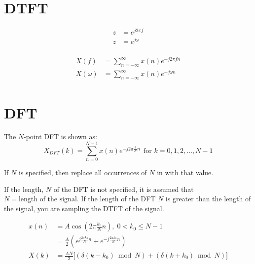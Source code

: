 \section{DTFT}
\begin{equation}\label{eq:1}
  \begin{aligned}
    z &= e^{j 2\pi f} \\
    z &= e^{j \omega} \\
  \end{aligned}
\end{equation}

\begin{equation}\label{eq:2}
  \begin{aligned}
    X(f) &= \sum\limits_{n=-\infty}^{\infty} x(n) e^{-j 2\pi f n} \\
    X(\omega) &= \sum\limits_{n=-\infty}^{\infty} x(n) e^{-j \omega n} \\
  \end{aligned}
\end{equation}

\section{DFT}
The $N$-point DFT is shown as:
\begin{equation}\label{eq:DFT}
  X_{DFT}(k) = \sum\limits_{n=0}^{N-1} x(n) e^{-j 2\pi \frac{k}{N} n} \:\: \text{for } k=0, 1, 2, \ldots, N-1
\end{equation}

If $N$ is specified, then replace all occurrences of $N$ in  with that value.

\begin{remark}
  If the length, $N$ of the DFT is not specified, it is assumed that $N = \text{length of the signal}$.
  If the length of the DFT $N$ is greater than the length of the signal, you are sampling the DTFT of the signal.
\end{remark}
\begin{equation}\label{eq:DFT_of_Cosine}
  \begin{aligned}
    x(n) &= A \cos \left( 2\pi \frac{k_{0}}{N} n \right),\; 0 < k_{0} \leq N-1 \\
    &= \frac{A}{2} \left( e^{j \frac{2\pi k_{0}}{N} n} + e^{-j \frac{2\pi k_{0}}{N} n} \right) \\
    X(k) &= \frac{AN}{2} \biggl[ (\delta(k-k_{0}) \bmod N) + (\delta(k+k_{0}) \bmod N) \biggr]
  \end{aligned}
\end{equation}


